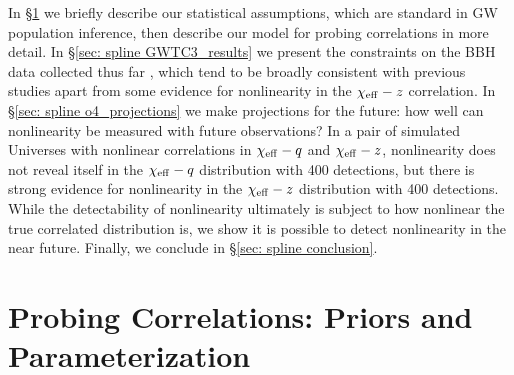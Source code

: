 \begin{refsection}
In \S \ref{sec: spline probe_correlations} we briefly describe our statistical assumptions, which are standard in \acf{GW} population inference, then describe our model for probing correlations in more detail. In \S \ref{sec: spline GWTC3_results} we present the constraints on the BBH data collected thus far \cite{LIGOScientific:2021djp}, which tend to be broadly consistent with previous studies apart from some evidence for nonlinearity in the $\chi_{\rm eff}-z$ correlation. %
In \S \ref{sec: spline o4_projections} we make projections for the future: how well can nonlinearity be measured with future observations? In a pair of simulated Universes with nonlinear correlations in $\chi_{\rm eff}-q$ and $\chi_{\rm eff}-z$, nonlinearity does not reveal itself in the $\chi_{\rm eff}-q$ distribution with 400 detections, but there is strong evidence for nonlinearity in the $\chi_{\rm eff}-z$ distribution with 400 detections. While the detectability of nonlinearity ultimately is subject to how nonlinear the true correlated distribution is, we show it is possible to detect nonlinearity in the near future. 
Finally, we conclude in \S \ref{sec: spline conclusion}.

\section{Probing Correlations: Priors and Parameterization}
\label{sec: spline probe_correlations}






\end{refsection}
